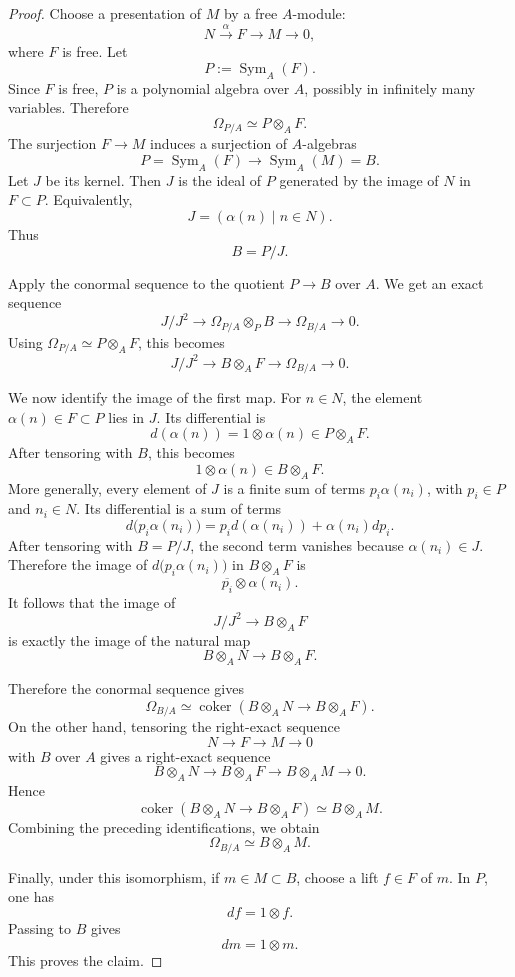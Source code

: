 \documentclass[11pt,twoside]{amsart}
\theoremstyle{plain}
\numberwithin{equation}{section}
\theoremstyle{definition}
\begin{document}
\begin{proof}
Choose a presentation of $M$ by a free $A$-module:
$$
N\xrightarrow{\alpha} F\longrightarrow M\longrightarrow 0,
$$
where $F$ is free. Let
$$
P:=\operatorname{Sym}_A(F).
$$
Since $F$ is free, $P$ is a polynomial algebra over $A$, possibly in infinitely many variables. Therefore
$$
\Omega_{P/A}\simeq P\otimes_A F.
$$
The surjection $F\to M$ induces a surjection of $A$-algebras
$$
P=\operatorname{Sym}_A(F)\longrightarrow \operatorname{Sym}_A(M)=B.
$$
Let $J$ be its kernel. Then $J$ is the ideal of $P$ generated by the image of $N$ in $F\subset P$. Equivalently,
$$
J=(\alpha(n)\mid n\in N).
$$
Thus
$$
B=P/J.
$$

Apply the conormal sequence to the quotient $P\to B$ over $A$. We get an exact sequence
$$
J/J^2
\longrightarrow
\Omega_{P/A}\otimes_P B
\longrightarrow
\Omega_{B/A}
\longrightarrow 0.
$$
Using $\Omega_{P/A}\simeq P\otimes_A F$, this becomes
$$
J/J^2
\longrightarrow
B\otimes_A F
\longrightarrow
\Omega_{B/A}
\longrightarrow 0.
$$

We now identify the image of the first map. For $n\in N$, the element $\alpha(n)\in F\subset P$ lies in $J$. Its differential is
$$
d(\alpha(n))=1\otimes \alpha(n)\in P\otimes_A F.
$$
After tensoring with $B$, this becomes
$$
1\otimes \alpha(n)\in B\otimes_A F.
$$
More generally, every element of $J$ is a finite sum of terms $p_i\alpha(n_i)$, with $p_i\in P$ and $n_i\in N$. Its differential is a sum of terms
$$
d\bigl(p_i\alpha(n_i)\bigr) =
p_id(\alpha(n_i))+\alpha(n_i)dp_i.
$$
After tensoring with $B=P/J$, the second term vanishes because $\alpha(n_i)\in J$. Therefore the image of $d\bigl(p_i\alpha(n_i)\bigr)$ in $B\otimes_A F$ is
$$
\overline{p_i}\otimes \alpha(n_i).
$$
It follows that the image of
$$
J/J^2\longrightarrow B\otimes_A F
$$
is exactly the image of the natural map
$$
B\otimes_A N\longrightarrow B\otimes_A F.
$$

Therefore the conormal sequence gives
$$
\Omega_{B/A}
\simeq
\operatorname{coker}\left(B\otimes_A N\longrightarrow B\otimes_A F\right).
$$
On the other hand, tensoring the right-exact sequence
$$
N\longrightarrow F\longrightarrow M\longrightarrow 0
$$
with $B$ over $A$ gives a right-exact sequence
$$
B\otimes_A N
\longrightarrow
B\otimes_A F
\longrightarrow
B\otimes_A M
\longrightarrow 0.
$$
Hence
$$
\operatorname{coker}\left(B\otimes_A N\longrightarrow B\otimes_A F\right)
\simeq
B\otimes_A M.
$$
Combining the preceding identifications, we obtain
$$
\Omega_{B/A}\simeq B\otimes_A M.
$$

Finally, under this isomorphism, if $m\in M\subset B$, choose a lift $f\in F$ of $m$. In $P$, one has
$$
df=1\otimes f.
$$
Passing to $B$ gives
$$
dm=1\otimes m.
$$
This proves the claim.
\end{proof}
\end{document}
